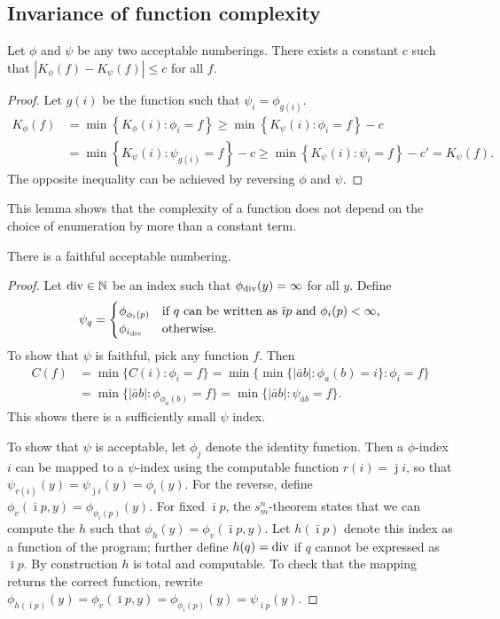 \documentclass{style/llncs}
\newcommand{\N}{\mathbb N}
\newcommand{\tn}[1]{\textnormal{#1}}
\begin{document}
\subsection{Invariance of function complexity}

\begin{lemma}
Let $\phi$ and $\psi$ be any two acceptable numberings. There exists a constant $c$ such that $\left| K_\phi(f) - K_\psi(f)\right | \leq c$ for all $f$. \label{lemma:invariance}
\end{lemma}
\begin{proof}
Let $g(i)$ be the function such that $\psi_i=\phi_{g(i)}$.
\begin{align*}
K_\phi(f) &= \min\left\{ K_\phi(i) : \phi_i= f\right\} 
\geq \min\left\{ K_\psi(i) : \phi_i= f\right\} - c\\
&= \min\left\{ K_\psi(i) : \psi_{g(i)}= f\right\} - c
\geq \min\left\{ K_\psi(i) : \psi_i= f\right\} - c' = K_\psi(f).
\end{align*}
The opposite inequality can be achieved by reversing $\phi$ and $\psi$. 
\end{proof}
This lemma shows that the complexity of a function does not depend on the choice of
enumeration by more than a constant term.

\begin{lemma}
  There is a faithful acceptable numbering.\label{lemma:faithful-numberings}
\end{lemma}
\begin{proof}
Let $\tn{div} \in \N$ be an index such that $\phi_{\tn{div}}(y)=\infty$ for all $y$. Define
  \[\psi_q=\begin{cases}
    \phi_{\phi_i(p)}&\tn{if $q$ can be written as $\bar\imath p$ and $\phi_i(p)<\infty$,}\\
    \phi_{i_\tn{div}}&\tn{otherwise.}\end{cases}
  \]
  To show that $\psi$ is faithful, pick any function $f$. Then
\[\begin{split}
C(f)&=\min\{C(i):\phi_i=f\} =\min\{\min\{|\bar a b|:\phi_a(b)=i\}:\phi_i=f\} \\
& =\min\{|\bar a b|:\phi_{\phi_a(b)}=f\}
 =\min\{|\bar a b|:\psi_{\bar a b}=f\}.
\end{split}\]
This shows there is a sufficiently small $\psi$ index.

To show that $\psi$ is acceptable, let $\phi_j$ denote the identity
function. Then a $\phi$-index $i$ can be mapped to a $\psi$-index
using the computable function $r(i)=\bar\jmath i$, so that
$\psi_{r(i)}(y)=\psi_{\bar\jmath i}(y)=\phi_i(y)$. For the reverse,
define $\phi_v(\bar\imath p, y)=\phi_{\phi_i(p)}(y)$. For fixed
$\bar\imath p$, the 
$s^n_m$-theorem \cite{kleene193notation} states that we can compute the $h$
such that $\phi_h(y)=\phi_v(\bar\imath p,y)$. Let $h(\bar\imath p)$
denote this index as a function of the program; further define
$h(q)=\tn{div}$ if $q$ cannot be expressed as $\bar\imath p$. By
construction $h$ is total and computable. To check that the mapping
returns the correct function, rewrite $\phi_{h(\bar\imath
  p)}(y)=\phi_v(\bar\imath p,y)=\phi_{\phi_i(p)}(y)=\psi_{\bar\imath p}(y)$.
\end{proof}
\end{document}
